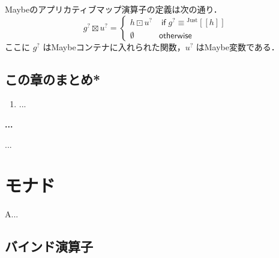 \documentclass[a5paper,twoside,fleqn]{jsbook}
\def\[{\left[\!\left[}
\def\]{\right]\!\right]}
\newenvironment{leader}{\begingroup\gt}{\endgroup}
\newenvironment{note}[1]{\begin{boxnote}\begin{center}\textbf{#1}\end{center}}{\end{boxnote}}
\newcommand{\mKeyword}[1]{\mathsf{#1}} %
\newcommand{\mIfKeyword}{\mKeyword{if}}
\newcommand{\mOtherwiseKeyword}{\mKeyword{otherwise}}
\DeclareMathOperator{\mIf}{\mIfKeyword}
\DeclareMathOperator{\mOtherwise}{\mOtherwiseKeyword}
\newcommand{\mNothing}{\emptyset}
\DeclareMathOperator{\mAppMapMaybe}{\boxtimes}
\DeclareMathOperator{\mLogicalAnd}{\wedge}
\DeclareMathOperator{\mMapMaybe}{\boxdot}
\newcommand{\mGenericValueConstructor}[1]{\mathrm{#1}}
\newcommand{\mGenericWith}[2]{{}^\mGenericValueConstructor{#1}\[#2\]}
\newcommand{\mJustWith}[1]{\mGenericWith{Just}{#1}}
\newcommand{\mMaybe}[1]{{#1}^?}
\begin{document}
Maybeのアプリカティブマップ演算子の定義は次の通り．
\begin{equation}
\label{eq:maybe-applicative-map-by-maybe-map}
\mMaybe{g}\mAppMapMaybe\mMaybe{u}
=\begin{cases}
h\mMapMaybe\mMaybe{u}&\mIf\mMaybe{g}\equiv\mJustWith{h}\\
\mNothing&\mOtherwise
\end{cases}
\end{equation}
ここに $\mMaybe{g}$ はMaybeコンテナに入れられた関数，$\mMaybe{u}$ はMaybe変数である．

\section{この章のまとめ*}

\begin{enumerate}
\item ...
\end{enumerate}


\begin{note}{...}
...
%
\end{note}

\chapter{モナド}
\label{ch:monad}

\begin{leader}
A...
\end{leader}

\section{バインド演算子}
\end{document}
